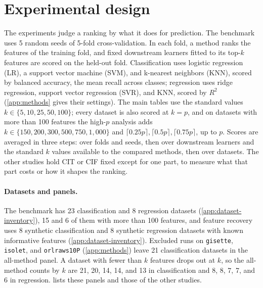 \section{Experimental design}
\label{sec:experiments}
\label{sec:experiments-protocol}

The experiments judge a ranking by what it does for prediction. The benchmark
uses 5 random seeds of 5-fold cross-validation. In each fold, a method ranks the
features of the training fold, and fixed downstream learners fitted to its
top-$k$ features are scored on the held-out fold. Classification uses logistic
regression (LR), a support vector machine (SVM), and k-nearest neighbors (KNN),
scored by balanced accuracy, the mean recall across classes; regression uses
ridge regression, support vector regression (SVR), and KNN, scored by $R^2$
(\cref{app:methods} gives their settings). The main tables use the standard
values $k \in \{5,10,25,50,100\}$; every dataset is also scored at $k=p$, and
on datasets with more than 100 features the high-$p$ analysis adds
$k \in \{150,200,300,500,750,1{,}000\}$ and
$\lceil 0.25p\rceil,\lceil 0.5p\rceil,\lceil 0.75p\rceil$, up to $p$.
\label{sec:experiments-analysis-plan}%
Scores are averaged in three steps: over folds and seeds, then over downstream
learners and the standard $k$ values available to the compared methods, then
over datasets. The other studies hold CIT or CIF fixed except for one part, to
measure what that part costs or how it shapes the ranking.

\paragraph{Datasets and panels.}
\label{sec:experiments-datasets}%
The benchmark has 23 classification and 8 regression datasets
(\cref{app:dataset-inventory}), 15 and 6 of them with more than 100 features,
and feature recovery uses 8 synthetic classification and 8 synthetic regression
datasets with known informative features (\cref{app:dataset-inventory}). Excluded runs on \nolinkurl{gisette},
\nolinkurl{isolet}, and \nolinkurl{orlraws10P} (\cref{app:methods}) leave 21
classification datasets in the all-method panel. A dataset with fewer
than $k$ features drops out at $k$, so the all-method counts by $k$ are 21, 20,
14, 14, and 13 in classification and 8, 8, 7, 7, and 6 in regression.
 lists these panels and those of the other studies.

